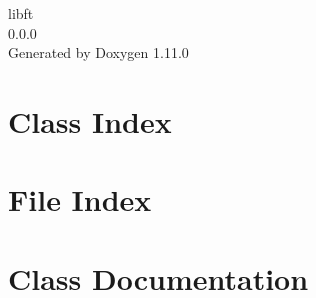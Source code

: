 \documentclass[twoside]{book}
\newcommand{\+}{\discretionary{\mbox{\scriptsize$\hookleftarrow$}}{}{}}
\newcommand{\clearemptydoublepage}{%
    \newpage{\pagestyle{empty}\cleardoublepage}%
  }
\begin{document}
  \raggedbottom
    \hypersetup{pageanchor=false,
                bookmarksnumbered=true,
                pdfencoding=unicode
               }
  \begin{titlepage}
  \vspace*{7cm}
  \begin{center}%
  {\Large libft}\\
  [1ex]\large 0.\+0.\+0 \\
  \vspace*{1cm}
  {\large Generated by Doxygen 1.11.0}\\
  \end{center}
  \end{titlepage}
  \clearemptydoublepage
  \tableofcontents
  \clearemptydoublepage
  \hypersetup{pageanchor=true}



\chapter{Class Index}

\chapter{File Index}

\chapter{Class Documentation}


\end{document}
